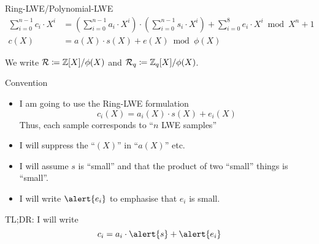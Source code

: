 \documentclass[xcolor=table,10pt,aspectratio=169]{beamer}
\providecommand{\ring}[0]{\ensuremath{\mathcal{R}}\xspace}
\providecommand{\ring}[0]{\ensuremath{\mathcal{R}}\xspace}
\begin{document}
\begin{frame}[label={sec:org8a14477}]{Ring-LWE/Polynomial-LWE}
\begin{align*}
\sum_{i=0}^{n-1} c_{i} \cdot X^{i} &= \left(\sum_{i=0}^{n-1} a_{i} \cdot X^{i}\right) \cdot \left(\sum_{i=0}^{n-1} s_{i} \cdot X^{i}\right) + \sum_{i=0}^{8} e_{i} \cdot X^{i} \bmod X^{n} +1\\
c(X) &= a(X) \cdot s(X) + e(X) \bmod \phi(X)
\end{align*}

We write \(\ring \coloneqq \ZZ[X]/\phi(X)\) and \(\ring_{q} \coloneqq \ZZ_{q}[X]/\phi(X)\).

{\footnotesize {} \par}

{\footnotesize {} \par}
\end{frame}
\begin{frame}[label={sec:org2fffe95}]{Convention}
\begin{itemize}
\item I am going to use the Ring-LWE formulation \[c_{i}(X) = a_{i}(X)\cdot s(X) + e_{i}(X)\]
Thus, each sample corresponds to ``\(n\) LWE samples''
\item I will suppress the ``\((X)\)'' in ``\(a(X)\)'' etc.
\item I will assume \(s\) is ``small'' and that the product of two ``small'' things is ``small''.
\item I will write \(\alert{e_{i}}\) to emphasise that \(e_{i}\) is small.
\end{itemize}
\begin{block}{TL;DR: I will write}
\[c_{i} = a_{i}\cdot \alert{s} + \alert{e_{i}}\]
\end{block}
\end{frame}
\end{document}
